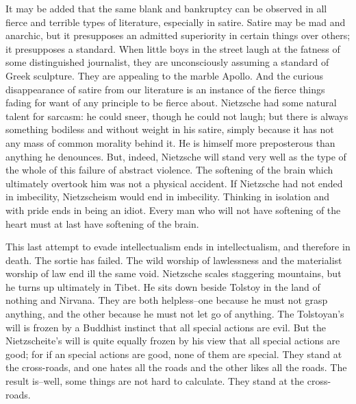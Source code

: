 \documentclass{book}
\begin{document}
It may be added that the same blank and bankruptcy can be observed in all fierce and terrible types of literature, especially in satire. Satire may be mad and anarchic, but it presupposes an admitted superiority in certain things over others; it presupposes a standard. When little boys in the street laugh at the fatness of some distinguished journalist, they are unconsciously assuming a standard of Greek sculpture. They are appealing to the marble Apollo. And the curious disappearance of satire from our literature is an instance of the fierce things fading for want of any principle to be fierce about. Nietzsche had some natural talent for sarcasm: he could sneer, though he could not laugh; but there is always something bodiless and without weight in his satire, simply because it has not any mass of common morality behind it. He is himself more preposterous than anything he denounces. But, indeed, Nietzsche will stand very well as the type of the whole of this failure of abstract violence. The softening of the brain which ultimately overtook him was not a physical accident. If Nietzsche had not ended in imbecility, Nietzscheism would end in imbecility. Thinking in isolation and with pride ends in being an idiot. Every man who will not have softening of the heart must at last have softening of the brain.

This last attempt to evade intellectualism ends in intellectualism, and therefore in death. The sortie has failed. The wild worship of lawlessness and the materialist worship of law end ill the same void. Nietzsche scales staggering mountains, but he turns up ultimately in Tibet. He sits down beside Tolstoy in the land of nothing and Nirvana. They are both helpless–one because he must not grasp anything, and the other because he must not let go of anything. The Tolstoyan’s will is frozen by a Buddhist instinct that all special actions are evil. But the Nietzscheite’s will is quite equally frozen by his view that all special actions are good; for if an special actions are good, none of them are special. They stand at the cross-roads, and one hates all the roads and the other likes all the roads. The result is–well, some things are not hard to calculate. They stand at the cross-roads.
\end{document}

